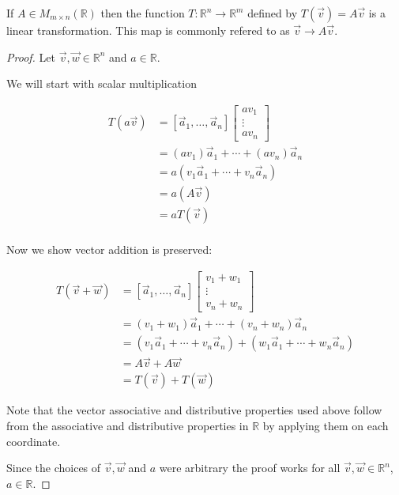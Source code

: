 \begin{proposition} If $A \in M_{m \times n}(\mathbb{R})$ then the function $T:\mathbb{R}^n \to \mathbb{R}^m$ defined by $T(\vec{v})=A\vec{v}$ is a linear transformation. This map is commonly refered to as $\vec{v} \to A\vec{v}$.
\end{proposition}
\begin{proof}
Let $\vec{v},\vec{w} \in \mathbb{R}^n$ and $a \in \mathbb{R}$. 

We will start with scalar multiplication 

\begin{align*}
T(a\vec{v})
&=[\vec{a}_1, \ldots, \vec{a}_n]
\begin{bmatrix}av_1\\ \vdots \\ av_n\end{bmatrix}\\
&=(av_1)\vec{a}_1+\cdots+(av_n)\vec{a}_n\\
&=a(v_1\vec{a}_1+\cdots+v_n\vec{a}_n)\\
&=a(A\vec{v})\\
&=aT(\vec{v})\\
\end{align*}


Now we show vector addition is preserved:


\begin{align*}
T(\vec{v}+\vec{w})
&=[\vec{a}_1, \ldots, \vec{a}_n]\begin{bmatrix}v_1+w_1\\ \vdots \\ v_n+w_n\end{bmatrix}\\
&=(v_1+w_1)\vec{a}_1+\cdots+(v_n+w_n)\vec{a}_n\\
&=(v_1\vec{a}_1+\cdots+v_n\vec{a}_n)+(w_1\vec{a}_1+\cdots+w_n\vec{a}_n)\\
&=A\vec{v}+A\vec{w}\\
&=T(\vec{v})+T(\vec{w})
\end{align*}

Note that the vector associative and distributive properties used above 
follow from the associative and distributive properties in $\mathbb{R}$ 
by applying them on each coordinate.

Since the choices of $\vec{v},\vec{w}$ and $a$ were arbitrary the proof works for all $\vec{v},\vec{w} \in \mathbb{R}^n$, $a \in \mathbb{R}$.

\end{proof}
